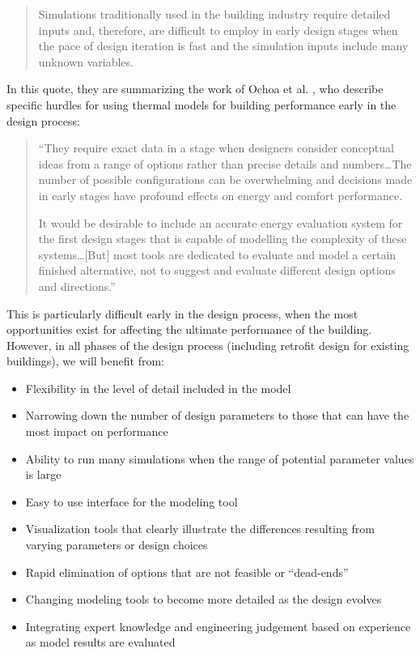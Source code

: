 \documentclass[10pt]{article}
\begin{document}
\begin{quote}
    Simulations traditionally used in the building industry require detailed inputs and, therefore, are difficult to employ in early design stages when the pace of design iteration is fast and the simulation inputs include many unknown variables. \cite{Samuelson2016-xw}
\end{quote}

In this quote, they are summarizing the work of Ochoa et al. \cite{Ochoa2009-pn}, who describe specific hurdles for using thermal models for building performance early in the design process:

\begin{quote}
``They require exact data in a stage when designers consider conceptual ideas from a range of options rather than precise details and numbers\ldots The number of possible
configurations can be overwhelming and decisions made in early stages have profound effects on energy and comfort performance. 

It would be desirable to include an accurate energy evaluation system for the first design stages that is capable of modelling the complexity of these systems\ldots[But] most tools are dedicated to evaluate and model a certain finished alternative, not to suggest and evaluate different design options and directions.'' \cite{Ochoa2009-pn}
    
\end{quote}

This is particularly difficult early in the design process, when the most opportunities exist for affecting the ultimate performance of the building. However, in all phases of the design process (including retrofit design for existing buildings), we will benefit from:

\begin{itemize}
    \setlength{\itemsep}{0pt}%
    \setlength{\parskip}{0pt}%
    \item Flexibility in the level of detail included in the model
    \item Narrowing down the number of design parameters to those that can have the most impact on performance \cite{Samuelson2016-xw}
        \item Ability to run many simulations when the range of potential parameter values is large
    \item Easy to use interface for the modeling tool \cite{Ochoa2009-pn}
    \item Visualization tools that clearly illustrate the differences resulting from varying parameters or design choices
    \item Rapid elimination of options that are not feasible or ``dead-ends'' \cite{Ochoa2009-pn}
        \item Changing modeling tools to become more detailed as the design evolves \cite{Samuelson2016-xw}
    \item Integrating expert knowledge and engineering judgement based on experience as model results are evaluated
\end{itemize}
\end{document}
